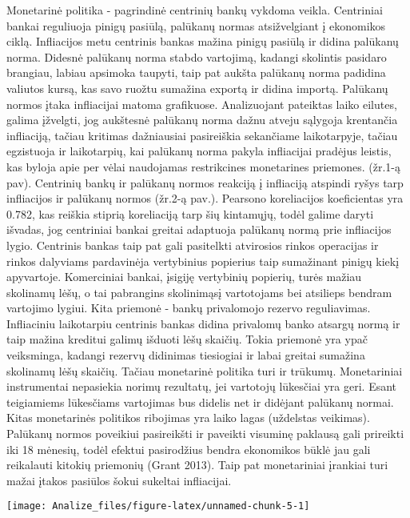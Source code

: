\documentclass[
]{article}
\let\origfigure\figure
\let\endorigfigure\endfigure
\renewenvironment{figure}[1][2] {
    \expandafter\origfigure\expandafter[H]
} {
    \endorigfigure
}
\begin{document}
Monetarinė politika - pagrindinė centrinių bankų vykdoma veikla.
Centriniai bankai reguliuoja pinigų pasiūlą, palūkanų normas
atsižvelgiant į ekonomikos ciklą. Infliacijos metu centrinis bankas
mažina pinigų pasiūlą ir didina palūkanų norma. Didesnė palūkanų norma
stabdo vartojimą, kadangi skolintis pasidaro brangiau, labiau apsimoka
taupyti, taip pat aukšta palūkanų norma padidina valiutos kursą, kas
savo ruožtu sumažina exportą ir didina importą. Palūkanų normos įtaka
infliacijai matoma grafikuose. Analizuojant pateiktas laiko eilutes,
galima įžvelgti, jog aukštesnė palūkanų norma dažnu atveju sąlygoja
krentančia infliaciją, tačiau kritimas dažniausiai pasireiškia
sekančiame laikotarpyje, tačiau egzistuoja ir laikotarpių, kai palūkanų
norma pakyla infliacijai pradėjus leistis, kas byloja apie per vėlai
naudojamas restrikcines monetarines priemones. (žr.1-ą pav). Centrinių
bankų ir palūkanų normos reakciją į infliaciją atspindi ryšys tarp
infliacijos ir palūkanų normos (žr.2-ą pav.). Pearsono koreliacijos
koeficientas yra 0.782, kas reiškia stiprią koreliaciją tarp šių
kintamųjų, todėl galime daryti išvadas, jog centriniai bankai greitai
adaptuoja palūkanų normą prie infliacijos lygio. Centrinis bankas taip
pat gali pasitelkti atvirosios rinkos operacijas ir rinkos dalyviams
pardavinėja vertybinius popierius taip sumažinant pinigų kiekį
apyvartoje. Komerciniai bankai, įsigiję vertybinių popierių, turės
mažiau skolinamų lėšų, o tai pabrangins skolinimąsį vartotojams bei
atsilieps bendram vartojimo lygiui. Kita priemonė - bankų privalomojo
rezervo reguliavimas. Infliaciniu laikotarpiu centrinis bankas didina
privalomų banko atsargų normą ir taip mažina kreditui galimų išduoti
lėšų skaičių. Tokia priemonė yra ypač veiksminga, kadangi rezervų
didinimas tiesiogiai ir labai greitai sumažina skolinamų lėšų skaičių.
Tačiau monetarinė politika turi ir trūkumų. Monetariniai instrumentai
nepasiekia norimų rezultatų, jei vartotojų lūkesčiai yra geri. Esant
teigiamiems lūkesčiams vartojimas bus didelis net ir didėjant palūkanų
normai. Kitas monetarinės politikos ribojimas yra laiko lagas (uždelstas
veikimas). Palūkanų normos poveikiui pasireikšti ir paveikti visuminę
paklausą gali prireikti iki 18 mėnesių, todėl efektui pasirodžius bendra
ekonomikos būklė jau gali reikalauti kitokių priemonių (Grant 2013).
Taip pat monetariniai įrankiai turi mažai įtakos pasiūlos šokui sukeltai
infliacijai.

\begin{figure}

{\centering \texttt{[image: Analize\_files/figure-latex/unnamed-chunk-5-1]} 

}

\caption{JAV vyriausybės išlaidos ir infliacija (1960-2019m).}\label{fig:unnamed-chunk-5}
\end{figure}
\end{document}
